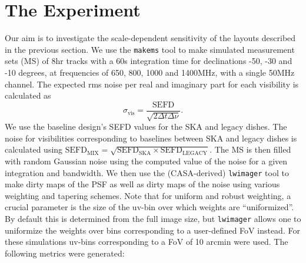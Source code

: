 \documentclass[sfheadings,a4paper,times,9pt,floats,floatfix]{article}
\begin{document}
\section{The Experiment}\label{sec:exp}
Our aim is to investigate the scale-dependent sensitivity of the layouts described in the previous section.
We use the \texttt{makems} tool to make simulated measurement sets (MS) of 8hr tracks with a 60s integration time for
declinations -50, -30 and -10 degrees, at frequencies of 650, 800, 1000 and 1400MHz, with a single 50MHz channel. The expected rms noise
per real and imaginary part for each visibility is calculated as 
\begin{equation}
\sigma_{\text{vis}} = \frac{\text{SEFD}}{\sqrt{2\Delta t\Delta \nu}}.
\end{equation}
We use the baseline design's SEFD values for the SKA and legacy dishes. The noise for visibilities corresponding to baselines
between SKA and legacy dishes is calculated using $\text{SEFD}_{\text{MIX}}=\sqrt{\text{SEFD}_{\text{SKA}} \times
\text{SEFD}_{\text{LEGACY}}}$. The MS is then filled with random Gaussian noise using the computed value of the noise for a
given integration and bandwidth. We then use the (CASA-derived) \texttt{lwimager} tool to make dirty maps of
the PSF as well as dirty maps of the noise using various weighting and tapering schemes. Note that for uniform and
robust weighting, a crucial parameter is the size of the uv-bin over which weights are “uniformized”. By default this is
determined from the full image size, but \texttt{lwimager} allows one to uniformize the weights over bins corresponding
to a user-defined FoV instead. For these simulations uv-bins corresponding to a FoV of 10 arcmin were used. The
following metrics were generated:
\end{document}
